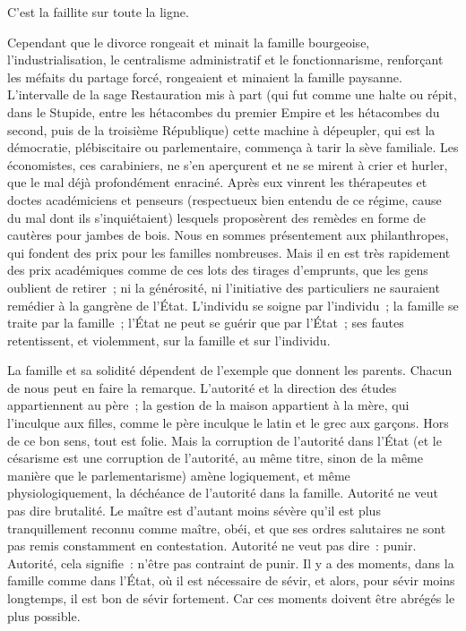 \documentclass[french,twoside]{book} %
\begin{document}
C’est la faillite sur toute la ligne.\par
Cependant que le divorce rongeait et minait la famille bourgeoise, l’industrialisation, le centralisme administratif et le fonctionnarisme, renforçant les méfaits du partage forcé, rongeaient et minaient la famille paysanne. L’intervalle de la sage Restauration mis à part (qui fut comme une halte ou répit, dans le Stupide, entre les hétacombes du premier Empire et les hétacombes du second, puis de la troisième République) cette machine à dépeupler, qui est la démocratie, plébiscitaire ou parlementaire, commença à tarir la sève familiale. Les économistes, ces carabiniers, ne s’en aperçurent et ne se mirent à crier et hurler, que le mal déjà profondément enraciné. Après eux vinrent les thérapeutes et doctes académiciens et penseurs (respectueux bien entendu de ce régime, cause du mal dont ils s’inquiétaient) lesquels proposèrent des remèdes en forme de cautères pour jambes de bois. Nous en sommes présentement aux philanthropes, qui fondent des prix pour les familles nombreuses. Mais il en est très rapidement des prix académiques comme de ces lots des tirages d’emprunts, que les gens oublient de retirer ; ni la générosité, ni l’initiative des particuliers ne sauraient remédier à la gangrène de l’État. L’individu se soigne par l’individu ; la famille se traite par la famille ; l’État ne peut se guérir que par l’État ; ses fautes retentissent, et violemment, sur la famille et sur l’individu.\par
La famille et sa solidité dépendent de l’exemple que donnent les parents. Chacun de nous peut en faire la remarque. L’autorité et la direction des études appartiennent au père ; la gestion de la maison appartient à la mère, qui l’inculque aux filles, comme le père inculque le latin et le grec aux garçons. Hors de ce bon sens, tout est folie. Mais la corruption de l’autorité dans l’État (et le césarisme est une corruption de l’autorité, au même titre, sinon de la même manière que le parlementarisme) amène logiquement, et même physiologiquement, la déchéance de l’autorité dans la famille. Autorité ne veut pas dire brutalité. Le maître est d’autant moins sévère qu’il est plus tranquillement reconnu comme maître, obéi, et que ses ordres salutaires ne sont pas remis constamment en contestation. Autorité ne veut pas dire : punir. Autorité, cela signifie : n’être pas contraint de punir. Il y a des moments, dans la famille comme dans l’État, où il est nécessaire de sévir, et alors, pour sévir moins longtemps, il est bon de sévir fortement. Car ces moments doivent être abrégés le plus possible.\par
\end{document}
